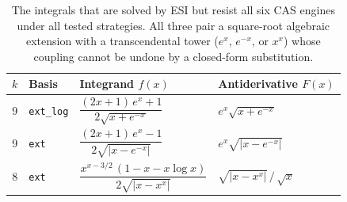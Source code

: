 \documentclass[preprint,12pt,authoryear]{elsarticle}
\begin{document}
\begin{table}
  \centering
  \caption{The integrals that are solved by ESI but resist all six CAS engines under all tested strategies. All three pair a square-root algebraic extension with a transcendental tower ($e^x$, $e^{-x}$, or $x^x$) whose coupling cannot be undone by a closed-form substitution.}
  \label{tab:cas_blind}
  \small
  \begin{tabular}{clll}
    \toprule
    $k$ & Basis & Integrand $f(x)$ & Antiderivative $F(x)$ \\
    \midrule
    9 & \texttt{ext\_log} &
      $\dfrac{(2x+1)\,e^x + 1}{2\sqrt{x + e^{-x}}}$ &
      $e^x\sqrt{x + e^{-x}}$ \\[8pt]
    9 & \texttt{ext} &
      $\dfrac{(2x+1)\,e^x - 1}{2\sqrt{\lvert x - e^{-x}\rvert}}$ &
      $e^x\sqrt{\lvert x - e^{-x}\rvert}$ \\[8pt]
    8 & \texttt{ext} &
      $\dfrac{x^{x - 3/2}\,(1 - x - x\log x)}{2\sqrt{\lvert x - x^x\rvert}}$ &
      $\sqrt{\lvert x - x^x\rvert}\,/\,\sqrt{x}$ \\[8pt]
    \bottomrule
  \end{tabular}
\end{table}

\end{document}
